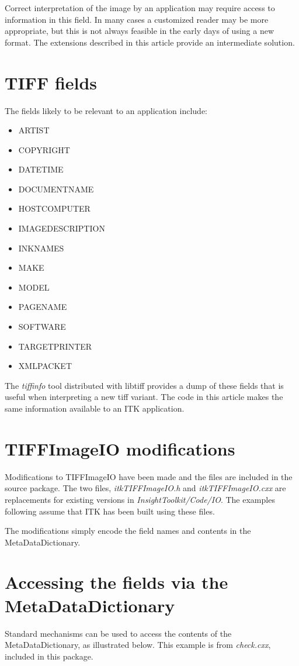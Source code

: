 \documentclass{InsightArticle}
\begin{document}
Correct interpretation of the image by an application may require
access to information in this field. In many cases a customized reader
may be more appropriate, but this is not always feasible in the early
days of using a new format. The extensions described in this article
provide an intermediate solution.

\section{TIFF fields}
The fields likely to be relevant to an application include:
\begin{itemize}
\item ARTIST
\item COPYRIGHT
\item DATETIME
\item DOCUMENTNAME
\item HOSTCOMPUTER
\item IMAGEDESCRIPTION
\item INKNAMES
\item MAKE
\item MODEL
\item PAGENAME
\item SOFTWARE
\item TARGETPRINTER
\item XMLPACKET
\end{itemize}

The {\em tiffinfo} tool distributed with libtiff provides a dump of
these fields that is useful when interpreting a new tiff variant. The
code in this article makes the same information available to an ITK
application.

\section{TIFFImageIO modifications}
Modifications to TIFFImageIO have been made and the files are included
in the source package. The two files, {\em itkTIFFImageIO.h} and {\em
  itkTIFFImageIO.cxx} are replacements for existing versions in {\em
  InsightToolkit/Code/IO}. The examples following assume that ITK has
been built using these files.

The modifications simply encode the field names and contents in the MetaDataDictionary.

\section{Accessing the fields via the MetaDataDictionary}
Standard mechanisms can be used to access the contents of the
MetaDataDictionary, as illustrated below. This example is from {\em check.cxx}, included
in this package. 
\end{document}
